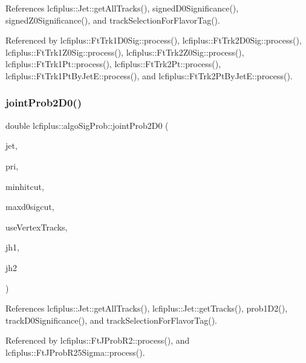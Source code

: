 References lcfiplus\+::\+Jet\+::get\+All\+Tracks(), signed\+D0\+Significance(), signed\+Z0\+Significance(), and track\+Selection\+For\+Flavor\+Tag().



Referenced by lcfiplus\+::\+Ft\+Trk1\+D0\+Sig\+::process(), lcfiplus\+::\+Ft\+Trk2\+D0\+Sig\+::process(), lcfiplus\+::\+Ft\+Trk1\+Z0\+Sig\+::process(), lcfiplus\+::\+Ft\+Trk2\+Z0\+Sig\+::process(), lcfiplus\+::\+Ft\+Trk1\+Pt\+::process(), lcfiplus\+::\+Ft\+Trk2\+Pt\+::process(), lcfiplus\+::\+Ft\+Trk1\+Pt\+By\+Jet\+E\+::process(), and lcfiplus\+::\+Ft\+Trk2\+Pt\+By\+Jet\+E\+::process().

\mbox{\label{namespacelcfiplus_1_1algoSigProb_a486e3c57f60524cfc1cc249a6a545ec6}} 
\subsubsection{joint\+Prob2\+D0()}
{\footnotesize\ttfamily double lcfiplus\+::algo\+Sig\+Prob\+::joint\+Prob2\+D0 (\begin{DoxyParamCaption}\item[{const \textbf{ Jet} $\ast$}]{jet,  }\item[{const \textbf{ Vertex} $\ast$}]{pri,  }\item[{int}]{minhitcut,  }\item[{double}]{maxd0sigcut,  }\item[{bool}]{use\+Vertex\+Tracks,  }\item[{const T\+H1 $\ast$}]{jh1,  }\item[{const T\+H1 $\ast$}]{jh2 }\end{DoxyParamCaption})}



References lcfiplus\+::\+Jet\+::get\+All\+Tracks(), lcfiplus\+::\+Jet\+::get\+Tracks(), prob1\+D2(), track\+D0\+Significance(), and track\+Selection\+For\+Flavor\+Tag().



Referenced by lcfiplus\+::\+Ft\+J\+Prob\+R2\+::process(), and lcfiplus\+::\+Ft\+J\+Prob\+R25\+Sigma\+::process().

\mbox{\label{namespacelcfiplus_1_1algoSigProb_ab08b0e00c34971b790e759fda81ec314}} 
